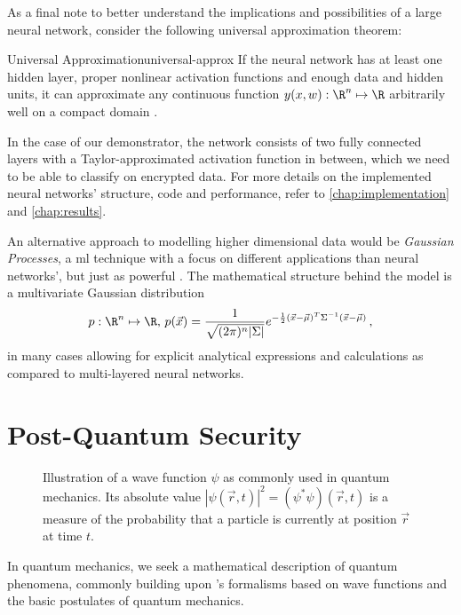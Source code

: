 As a final note to better understand the implications and possibilities of a large neural network, consider the following universal approximation theorem:

\begin{theorem}{Universal Approximation}{universal-approx}
  If the neural network has at least one hidden layer, proper nonlinear activation functions and enough data and hidden units, it can approximate any continuous function $y(x, w): \R^n \mapsto \R$ arbitrarily well on a compact domain \parencite{1989-HornikMultilayerFN}.
\end{theorem}

In the case of our demonstrator, the network consists of two fully connected layers with a Taylor-approximated  activation function in between, which we need to be able to classify on encrypted data.
For more details on the implemented neural networks' structure, code and performance, refer to \cref{chap:implementation} and \cref{chap:results}.

An alternative approach to modelling higher dimensional data would be \textit{Gaussian Processes}, a \glsdesc{ml} technique with a focus on different applications than neural networks', but just as powerful \parencite[Chapter 45]{2005-mackay-information-theory}.
The mathematical structure behind the model is a multivariate Gaussian distribution $$p: \R^n \mapsto \R,\, p(\vec{x}) = \frac{1}{\sqrt{(2\pi)^n |\Sigma|}} e^{-\frac{1}{2} (\vec{x}-\vec{\mu})^T \Sigma\inv (\vec{x}-\vec{\mu})} \,,$$ in many cases allowing for explicit analytical expressions and calculations as compared to multi-layered neural networks.

\pagebreak
\section{Post-Quantum Security}
\label{sec:post-quantum-sec}
\begin{figure}[H]
  \centering
  \caption[Illustration of a wave function]{
    Illustration of a wave function $\psi$ as commonly used in quantum mechanics.
    Its absolute value $|\psi(\vec{r}, t)|^2 = (\psi^* \psi)(\vec{r}, t)$ is a measure of the probability that a particle is currently at position $\vec{r}$ at time $t$.
  }
  \label{fig:wave-function}
\end{figure}

In quantum mechanics, we seek a mathematical description of quantum phenomena, commonly building upon 's formalisms based on wave functions and the basic postulates of quantum mechanics.

